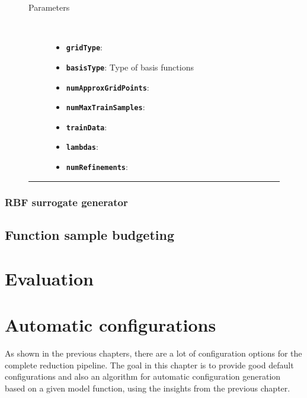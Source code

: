 \documentclass[
  a4paper,  %
  twoside,  %
  bibliography=totoc,
  headsepline,
  cleardoublepage=empty,
  parskip=half,
  draft=false
]{scrbook}
\newcommand{\delimit}{{\color{charcoal}\noindent\rule{\textwidth}{1pt}}}
\begin{document}
\newpage

\begin{mdframed}[style=style,frametitle={Surrogate generator (sparse grid)}]
\begin{figure}[H]
\begin{description}
\item[Parameters] {~ \begin{itemize}[\indent{}]
\item \texttt{\textbf{gridType}}: 
\item \texttt{\textbf{basisType}}: Type of basis functions
\item \texttt{\textbf{numApproxGridPoints}}:
\item \texttt{\textbf{numMaxTrainSamples}}: 
\item \texttt{\textbf{trainData}}:
\item \texttt{\textbf{lambdas}}: 
\item \texttt{\textbf{numRefinements}}: 
\end{itemize}}
\end{description}

\delimit

\label{fig:sgsg}
\end{figure}
\end{mdframed}

\subsection {RBF surrogate generator}


\section{Function sample budgeting}


\chapter{Evaluation}
\label{chap:c7}

\chapter{Automatic configurations}
\label{chap:c8}

As shown in the previous chapters, there are a lot of configuration options for the complete reduction pipeline.
The goal in this chapter is to provide good default configurations and also an algorithm for automatic configuration generation based on a given model function, using the insights from the previous chapter.
\end{document}
